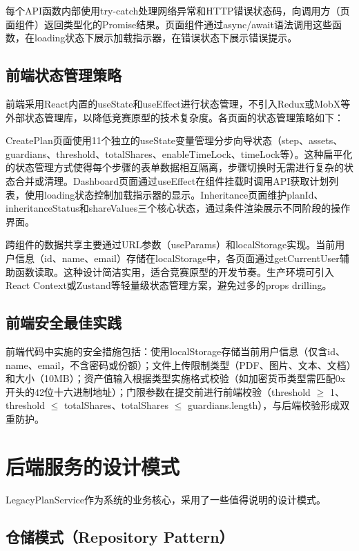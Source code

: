 \documentclass[UTF8,a4paper,zihao=-4,openany]{ctexrep}
\begin{document}
每个API函数内部使用try-catch处理网络异常和HTTP错误状态码，向调用方（页面组件）返回类型化的Promise结果。页面组件通过async/await语法调用这些函数，在loading状态下展示加载指示器，在错误状态下展示错误提示。

\subsection{前端状态管理策略}

前端采用React内置的useState和useEffect进行状态管理，不引入Redux或MobX等外部状态管理库，以降低竞赛原型的技术复杂度。各页面的状态管理策略如下：

CreatePlan页面使用11个独立的useState变量管理分步向导状态（step、assets、guardians、threshold、totalShares、enableTimeLock、timeLock等）。这种扁平化的状态管理方式使得每个步骤的表单数据相互隔离，步骤切换时无需进行复杂的状态合并或清理。Dashboard页面通过useEffect在组件挂载时调用API获取计划列表，使用loading状态控制加载指示器的显示。Inheritance页面维护planId、inheritanceStatus和shareValues三个核心状态，通过条件渲染展示不同阶段的操作界面。

跨组件的数据共享主要通过URL参数（useParams）和localStorage实现。当前用户信息（id、name、email）存储在localStorage中，各页面通过getCurrentUser辅助函数读取。这种设计简洁实用，适合竞赛原型的开发节奏。生产环境可引入React Context或Zustand等轻量级状态管理方案，避免过多的props drilling。

\subsection{前端安全最佳实践}

前端代码中实施的安全措施包括：使用localStorage存储当前用户信息（仅含id、name、email，不含密码或份额）；文件上传限制类型（PDF、图片、文本、文档）和大小（10MB）；资产值输入根据类型实施格式校验（如加密货币类型需匹配0x开头的42位十六进制地址）；门限参数在提交前进行前端校验（threshold $\ge$ 1、threshold $\le$ totalShares、totalShares $\le$ guardians.length），与后端校验形成双重防护。

\section{后端服务的设计模式}

LegacyPlanService作为系统的业务核心，采用了一些值得说明的设计模式。

\subsection{仓储模式（Repository Pattern）}
\end{document}
